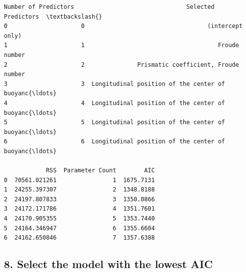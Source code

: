 \documentclass[1pt]{article}
\begin{document}
    \begin{Verbatim}[commandchars=\\\{\}]
   Number of Predictors                                Selected Predictors  \textbackslash{}
0                     0                                   (intercept only)   
1                     1                                      Froude number   
2                     2               Prismatic coefficient, Froude number   
3                     3  Longitudinal position of the center of buoyanc{\ldots}   
4                     4  Longitudinal position of the center of buoyanc{\ldots}   
5                     5  Longitudinal position of the center of buoyanc{\ldots}   
6                     6  Longitudinal position of the center of buoyanc{\ldots}   

            RSS  Parameter Count        AIC  
0  70561.021261                1  1675.7131  
1  24255.397307                2  1348.8188  
2  24197.807833                3  1350.0866  
3  24172.171786                4  1351.7601  
4  24170.905355                5  1353.7440  
5  24164.346947                6  1355.6604  
6  24162.650846                7  1357.6388
    \end{Verbatim}


    \hypertarget{select-the-model-with-the-lowest-aic}{%
        \subsection{8. Select the model with the lowest
        AIC}\label{select-the-model-with-the-lowest-aic}}
\end{document}
